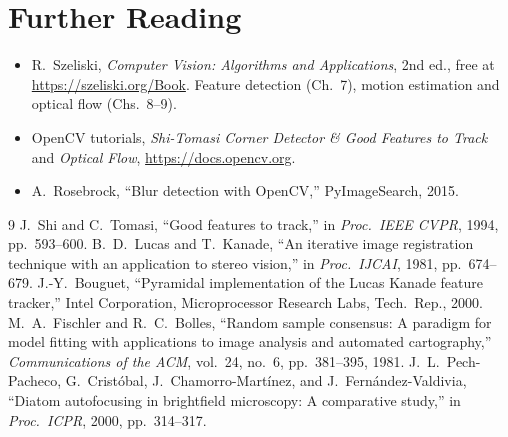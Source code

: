 \documentclass[11pt]{article}
\begin{document}
\section*{Further Reading}
\begin{itemize}\raggedright
  \item R.~Szeliski, \emph{Computer Vision: Algorithms and Applications}, 2nd ed.,
        free at \url{https://szeliski.org/Book}. Feature detection (Ch.~7),
        motion estimation and optical flow (Chs.~8--9).
  \item OpenCV tutorials, \emph{Shi-Tomasi Corner Detector \& Good Features to Track}
        and \emph{Optical Flow}, \url{https://docs.opencv.org}.
  \item A.~Rosebrock, ``Blur detection with OpenCV,'' PyImageSearch, 2015.
\end{itemize}

\begin{thebibliography}{9}
 J.~Shi and C.~Tomasi, ``Good features to track,'' in
  \emph{Proc.\ IEEE CVPR}, 1994, pp.~593--600.
 B.~D.~Lucas and T.~Kanade, ``An iterative image
  registration technique with an application to stereo vision,'' in
  \emph{Proc.\ IJCAI}, 1981, pp.~674--679.
 J.-Y.~Bouguet, ``Pyramidal implementation of the Lucas
  Kanade feature tracker,'' Intel Corporation, Microprocessor Research Labs,
  Tech.\ Rep., 2000.
 M.~A.~Fischler and R.~C.~Bolles, ``Random sample
  consensus: A paradigm for model fitting with applications to image analysis
  and automated cartography,'' \emph{Communications of the ACM}, vol.~24,
  no.~6, pp.~381--395, 1981.
 J.~L.~Pech-Pacheco, G.~Crist\'obal, J.~Chamorro-Mart\'inez,
  and J.~Fern\'andez-Valdivia, ``Diatom autofocusing in brightfield
  microscopy: A comparative study,'' in \emph{Proc.\ ICPR}, 2000,
  pp.~314--317.
\end{thebibliography}
\end{document}
